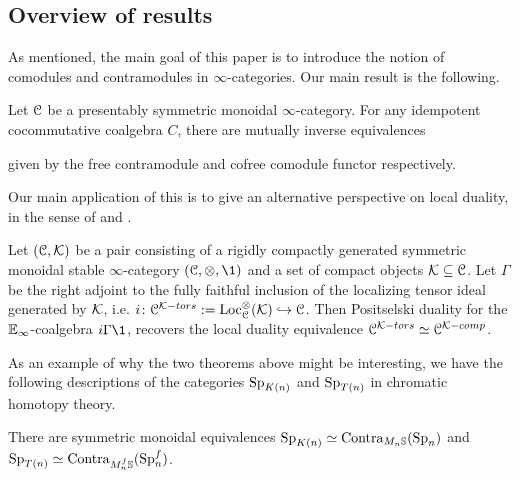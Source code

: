 \subsection*{Overview of results}

As mentioned, the main goal of this paper is to introduce the notion of comodules and contramodules in $\infty$-categories. Our main result is the following. 

\begin{introthm}
    \label{ch2:introthm:A}
    Let $\EuScript{C}$ be a presentably symmetric monoidal $\infty$-category. For any idempotent cocommutative coalgebra $C$, there are mutually inverse equivalences
    \begin{center}
    \end{center}
    given by the free contramodule and cofree comodule functor respectively. 
\end{introthm}

Our main application of this is to give an alternative perspective on local duality, in the sense of \cite{hovey-palmiery-strickland_97} and \cite{barthel-heard-valenzuela_2018}. 

\begin{introthm}
    \label{ch2:introthm:B}
    Let $(\EuScript{C}, \mathcal{K})$ be a pair consisting of a rigidly compactly generated symmetric monoidal stable $\infty$-category $(\C, \otimes, \1)$ and a set of compact objects $\mathcal{K}\subseteq \EuScript{C}$. Let $\Gamma$ be the right adjoint to the fully faithful inclusion of the localizing tensor ideal generated by $\mathcal{K}$, i.e. $i\colon\EuScript{C}^{\mathcal{K}-tors}:= \operatorname{Loc}_{\EuScript{C}}^\otimes (\mathcal{K})\hookrightarrow \EuScript{C}$. Then Positselski duality for the $\mathbb{E}_\infty$-coalgebra $i\Gamma \1$, recovers the local duality equivalence $\EuScript{C}^{\mathcal{K}-tors} \simeq \EuScript{C}^{\mathcal{K}-comp}$. 
\end{introthm}

As an example of why the two theorems above might be interesting, we have the following descriptions of the categories $\mathrm{Sp}_{K(n)}$ and $\mathrm{Sp}_{T(n)}$ in chromatic homotopy theory. 

\begin{introcor}
    There are symmetric monoidal equivalences $\mathrm{Sp}_{K(n)}\simeq \mathrm{Contra}_{M_n\mathbb{S}}(\mathrm{Sp}_n)$ and $\mathrm{Sp}_{T(n)}\simeq \mathrm{Contra}_{M_n^f \mathbb{S}}(\mathrm{Sp}_n^f)$. 
\end{introcor}



